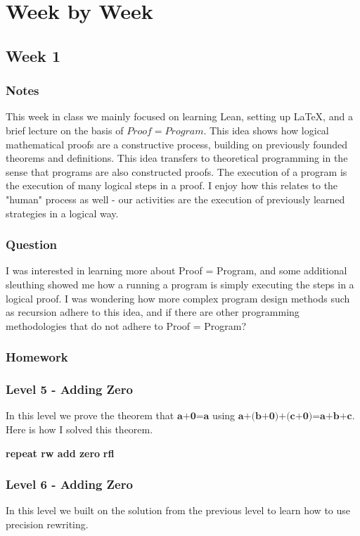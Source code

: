 \documentclass{article}
\theoremstyle{theorem}
\theoremstyle{definition}
\theoremstyle{remark}
\begin{document}
\section{Week by Week}\label{homework}

\subsection{Week 1}

\subsubsection*{Notes}
This week in class we mainly focused on learning Lean, setting up \LaTeX, and a brief lecture on the basis of $Proof = Program$. This idea shows how logical mathematical proofs are a constructive process, building on previously founded theorems and definitions. This idea transfers to theoretical programming in the sense that programs are also constructed proofs. The execution of a program is the execution of many logical steps in a proof. I enjoy how this relates to the "human" process as well - our activities are the execution of previously learned strategies in a logical way.

\subsubsection*{Question} I was interested in learning more about Proof = Program, and some additional sleuthing showed me how a running a program is simply executing the steps in a logical proof. I was wondering how more complex program design methods such as recursion adhere to this idea, and if there are other programming methodologies that do not adhere to Proof = Program?

\subsubsection*{Homework}

  \subsubsection*{Level 5 - Adding Zero}
  In this level we prove the theorem that $\textbf{a+0=a}$ using $\textbf{a+(b+0)+(c+0)=a+b+c}$. Here is how I solved this theorem.

  \bgroup\obeylines
  \qquad \textbf{repeat rw add zero}
  \qquad \textbf{rfl}
  \egroup

  \subsubsection*{Level 6 - Adding Zero}
  In this level we built on the solution from the previous level to learn how to use precision rewriting.
\end{document}
